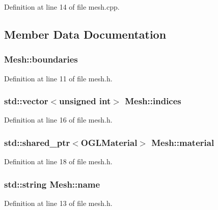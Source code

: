 Definition at line 14 of file mesh.\+cpp.



\subsection{Member Data Documentation}
\hypertarget{class_mesh_af058fb0d0fd3933311a4a05621ec95f7}{}
\subsubsection[{boundaries}]{ Mesh\+::boundaries}\label{class_mesh_af058fb0d0fd3933311a4a05621ec95f7}


Definition at line 11 of file mesh.\+h.

\hypertarget{class_mesh_a26632e27b772f24b069a738e7983b9da}{}
\subsubsection[{indices}]{\setlength{\rightskip}{0pt plus 5cm}std\+::vector$<$unsigned int$>$ Mesh\+::indices}\label{class_mesh_a26632e27b772f24b069a738e7983b9da}


Definition at line 16 of file mesh.\+h.

\hypertarget{class_mesh_ae392f8f4565054b3ef98ab2d41f86cc9}{}
\subsubsection[{material}]{\setlength{\rightskip}{0pt plus 5cm}std\+::shared\+\_\+ptr$<${\bf O\+G\+L\+Material}$>$ Mesh\+::material}\label{class_mesh_ae392f8f4565054b3ef98ab2d41f86cc9}


Definition at line 18 of file mesh.\+h.

\hypertarget{class_mesh_ac687e9dcfc7cc60b046fc2ec634200be}{}
\subsubsection[{name}]{\setlength{\rightskip}{0pt plus 5cm}std\+::string Mesh\+::name}\label{class_mesh_ac687e9dcfc7cc60b046fc2ec634200be}


Definition at line 13 of file mesh.\+h.

